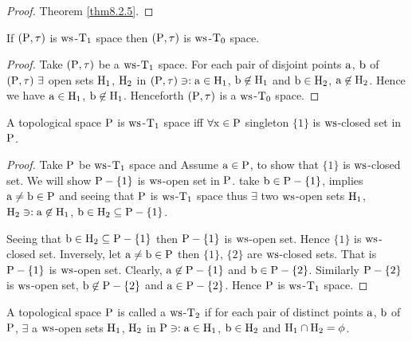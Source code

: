 \begin{proof}
Theorem \ref{thm8.2.5}.
\end{proof}

\begin{thm}\label{thm8.2.12}
If $(\mathrm{P}, \tau)$ is $\mathrm{ws}$-$\mathrm{T}_{1}$ space then $(\mathrm{P}, \tau)$ is $\mathrm{ws}$-$\mathrm{T}_{0}$ space.
\end{thm}

\begin{proof}
Take $(\mathrm{P}, \tau)$ be a $\mathrm{ws}$-$\mathrm{T}_{1}$ space. For each pair of disjoint points $\mathrm{a}$, $\mathrm{b}$ of $(\mathrm{P}, \tau) \ \exists$ open sets $\mathrm{H}_{1}$, $\mathrm{H}_{2}$ in $(\mathrm{P}, \tau) \ni: \mathrm{a} \in \mathrm{H}_{1}$, $\mathrm{b} \not\in \mathrm{H}_{1}$ and $\mathrm{b} \in \mathrm{H}_{2}$, $\mathrm{a} \not\in \mathrm{H}_{2}$. Hence we have $\mathrm{a} \in \mathrm{H}_{1}$, $\mathrm{b} \not\in \mathrm{H}_{1}$. Henceforth $(\mathrm{P}, \tau)$ is a $\mathrm{ws}$-$\mathrm{T}_{0}$ space.
\end{proof}

\begin{thm}\label{thm8.2.13}
A topological space $\mathrm{P}$ is $\mathrm{ws}$-$\mathrm{T}_{1}$ space iff $\forall \mathrm{x}\in \mathrm{P}$ singleton $\{1\}$ is $\mathrm{ws}$-closed set in $\mathrm{P}$.
\end{thm}

\begin{proof}
Take $\mathrm{P}$ be $\mathrm{ws}$-$\mathrm{T}_{1}$ space and Assume $\mathrm{a} \in \mathrm{P}$, to show that $\{1\}$ is $\mathrm{ws}$-closed set. We will show $\mathrm{P}-\{1\}$ is $\mathrm{ws}$-open set in $\mathrm{P}$. take $\mathrm{b} \in \mathrm{P}-\{1\}$, implies $\mathrm{a} \neq \mathrm{b} \in \mathrm{P}$ and seeing that $\mathrm{P}$ is $\mathrm{ws}$-$\mathrm{T}_{1}$ space thus $\exists$ two $\mathrm{ws}$-open sets $\mathrm{H}_{1}$, $\mathrm{H}_{2} \ni: \mathrm{a} \not\in \mathrm{H}_{1}$, $\mathrm{b} \in \mathrm{H}_{2} \subseteq \mathrm{P}-\{1\}$.

Seeing that $\mathrm{b}\in \mathrm{H}_{2} \subseteq \mathrm{P}-\{1\}$ then $\mathrm{P}-\{1\}$ is $\mathrm{ws}$-open set. Hence $\{1\}$ is $\mathrm{ws}$-closed set. Inversely, let $\mathrm{a} \neq \mathrm{b} \in \mathrm{P}$ then $\{1\}$, $\{2\}$ are $\mathrm{ws}$-closed sets. That is $\mathrm{P}-\{1\}$ is $\mathrm{ws}$-open set. Clearly, $\mathrm{a} \not\in \mathrm{P}-\{1\}$ and $\mathrm{b} \in \mathrm{P}-\{2\}$. Similarly $\mathrm{P}-\{2\}$ is $\mathrm{ws}$-open set, $\mathrm{b} \not\in \mathrm{P}-\{2\}$ and $\mathrm{a} \in \mathrm{P}-\{2\}$. Hence $\mathrm{P}$ is $\mathrm{ws}$-$\mathrm{T}_{1}$ space.
\end{proof}

\begin{dfn}\label{defi8.2.14}
A topological space $\mathrm{P}$ is called a $\mathrm{ws}$-$\mathrm{T}_{2}$ if for each pair of distinct points $\mathrm{a}$, $\mathrm{b}$ of $\mathrm{P}$, $\exists$ a $\mathrm{ws}$-open sets $\mathrm{H}_{1}$, $\mathrm{H}_{2}$ in $\mathrm{P} \ni: \mathrm{a} \in \mathrm{H}_{1}$, $\mathrm{b} \in \mathrm{H}_{2}$ and $\mathrm{H}_{1} \cap \mathrm{H}_{2} = \phi$.
\end{dfn}

